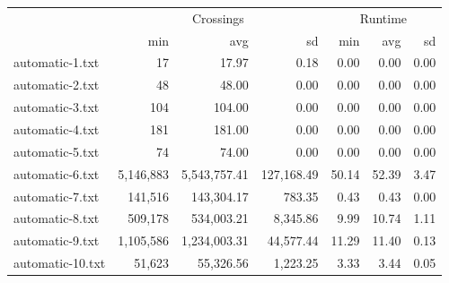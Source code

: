 \begin{tabular}{l|rrr|rrr|}
  \toprule   & \multicolumn{3}{c}{Crossings} & \multicolumn{3}{c}{Runtime} \\ & min & avg & sd & min & avg & sd \\ 
  \midrule automatic-1.txt & 17 & 17.97 & 0.18 & 0.00 & 0.00 & 0.00 \\ 
  automatic-2.txt & 48 & 48.00 & 0.00 & 0.00 & 0.00 & 0.00 \\ 
  automatic-3.txt & 104 & 104.00 & 0.00 & 0.00 & 0.00 & 0.00 \\ 
  automatic-4.txt & 181 & 181.00 & 0.00 & 0.00 & 0.00 & 0.00 \\ 
  automatic-5.txt & 74 & 74.00 & 0.00 & 0.00 & 0.00 & 0.00 \\ 
  automatic-6.txt & 5,146,883 & 5,543,757.41 & 127,168.49 & 50.14 & 52.39 & 3.47 \\ 
  automatic-7.txt & 141,516 & 143,304.17 & 783.35 & 0.43 & 0.43 & 0.00 \\ 
  automatic-8.txt & 509,178 & 534,003.21 & 8,345.86 & 9.99 & 10.74 & 1.11 \\ 
  automatic-9.txt & 1,105,586 & 1,234,003.31 & 44,577.44 & 11.29 & 11.40 & 0.13 \\ 
  automatic-10.txt & 51,623 & 55,326.56 & 1,223.25 & 3.33 & 3.44 & 0.05 \\ 
   \bottomrule \end{tabular}
